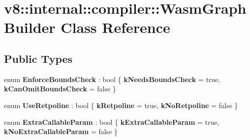 \hypertarget{classv8_1_1internal_1_1compiler_1_1WasmGraphBuilder}{}\section{v8\+:\+:internal\+:\+:compiler\+:\+:Wasm\+Graph\+Builder Class Reference}
\label{classv8_1_1internal_1_1compiler_1_1WasmGraphBuilder}
\subsection*{Public Types}
\begin{DoxyCompactItemize}
\item 
\mbox{\label{classv8_1_1internal_1_1compiler_1_1WasmGraphBuilder_a8eb4ceb15bca1aeb1b81a35bf55b5939}} 
enum {\bfseries Enforce\+Bounds\+Check} \+: bool \{ {\bfseries k\+Needs\+Bounds\+Check} = true, 
{\bfseries k\+Can\+Omit\+Bounds\+Check} = false
 \}
\item 
\mbox{\label{classv8_1_1internal_1_1compiler_1_1WasmGraphBuilder_ad334051b3dafd6c87637d63c718126aa}} 
enum {\bfseries Use\+Retpoline} \+: bool \{ {\bfseries k\+Retpoline} = true, 
{\bfseries k\+No\+Retpoline} = false
 \}
\item 
\mbox{\label{classv8_1_1internal_1_1compiler_1_1WasmGraphBuilder_a736b386a4a41279b37af39f11cfd0b6a}} 
enum {\bfseries Extra\+Callable\+Param} \+: bool \{ {\bfseries k\+Extra\+Callable\+Param} = true, 
{\bfseries k\+No\+Extra\+Callable\+Param} = false
 \}
\end{DoxyCompactItemize}
